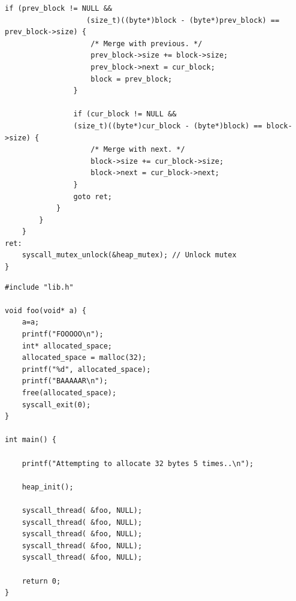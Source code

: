 \documentclass[11pt,a4paper]{article}
\theoremstyle{plain}
\theoremstyle{definition}
\theoremstyle{remark}
\numberwithin{equation}{section}
\begin{document}
\begin{lstlisting}[caption={P1: Lib.c Changes},label={lst:p1_lib.c}]
                if (prev_block != NULL &&
                   (size_t)((byte*)block - (byte*)prev_block) == prev_block->size) {
                    /* Merge with previous. */
                    prev_block->size += block->size;
                    prev_block->next = cur_block;
                    block = prev_block;
                }

                if (cur_block != NULL &&
                (size_t)((byte*)cur_block - (byte*)block) == block->size) {
                    /* Merge with next. */
                    block->size += cur_block->size;
                    block->next = cur_block->next;
                }
                goto ret;
            }
        }
    }
ret:
    syscall_mutex_unlock(&heap_mutex); // Unlock mutex
}
\end{lstlisting}

\begin{lstlisting}[caption={P1: mal\_fre.c},label={lst:p1-mal_fre.c}]
#include "lib.h"

void foo(void* a) {
    a=a;
    printf("FOOOOO\n");
    int* allocated_space;
    allocated_space = malloc(32);
    printf("%d", allocated_space);
    printf("BAAAAAR\n");
    free(allocated_space);
    syscall_exit(0);
}

int main() {

    printf("Attempting to allocate 32 bytes 5 times..\n");

    heap_init();

    syscall_thread( &foo, NULL);
    syscall_thread( &foo, NULL);
    syscall_thread( &foo, NULL);
    syscall_thread( &foo, NULL);
    syscall_thread( &foo, NULL);

    return 0;
}

\end{lstlisting}

%
%
\end{document}
